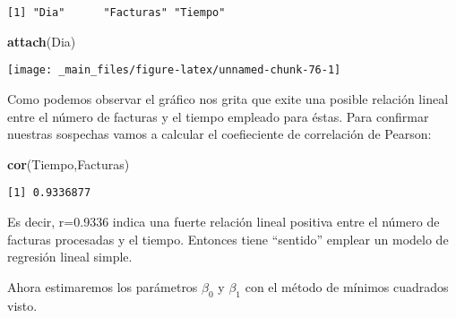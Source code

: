 \documentclass[
  a4paper,
  oneside,
  openany]{book}
\newenvironment{Shaded}{\begin{snugshade}}{\end{snugshade}}
\newcommand{\DataTypeTok}[1]{\textcolor[rgb]{0.13,0.29,0.53}{#1}}
\newcommand{\DecValTok}[1]{\textcolor[rgb]{0.00,0.00,0.81}{#1}}
\newcommand{\KeywordTok}[1]{\textcolor[rgb]{0.13,0.29,0.53}{\textbf{#1}}}
\newcommand{\NormalTok}[1]{#1}
\newcommand{\OperatorTok}[1]{\textcolor[rgb]{0.81,0.36,0.00}{\textbf{#1}}}
\newcommand{\StringTok}[1]{\textcolor[rgb]{0.31,0.60,0.02}{#1}}
\begin{document}
\begin{verbatim}
[1] "Dia"      "Facturas" "Tiempo"  
\end{verbatim}

\begin{Shaded}
\begin{Highlighting}[]
\KeywordTok{attach}\NormalTok{(Dia)}
\end{Highlighting}
\end{Shaded}

\begin{Shaded}
\end{Shaded}

\begin{center}\texttt{[image: \_main\_files/figure-latex/unnamed-chunk-76-1]} \end{center}

Como podemos observar el gráfico nos grita que exite una posible relación lineal entre el número de facturas y el tiempo empleado para éstas.
Para confirmar nuestras sospechas vamos a calcular el coefieciente de correlación de Pearson:

\begin{Shaded}
\begin{Highlighting}[]
\KeywordTok{cor}\NormalTok{(Tiempo,Facturas)}
\end{Highlighting}
\end{Shaded}

\begin{verbatim}
[1] 0.9336877
\end{verbatim}

Es decir, r=0.9336 indica una fuerte relación lineal positiva entre el número de facturas procesadas y el tiempo. Entonces tiene ``sentido'' emplear un modelo de regresión lineal simple.

Ahora estimaremos los parámetros \(\beta_{0}\) y \(\beta_{1}\) con el método de mínimos cuadrados visto.
\end{document}
